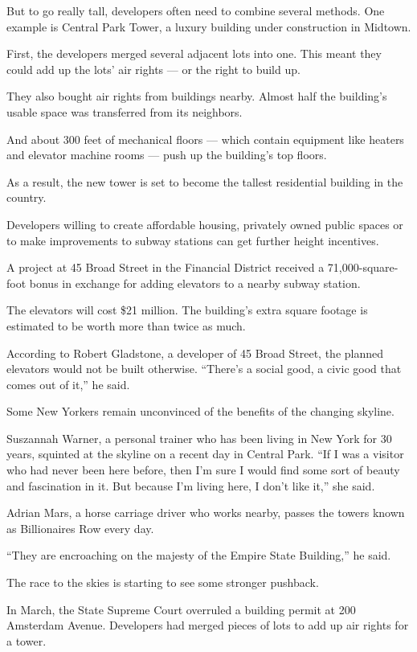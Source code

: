 But to go really tall, developers often need to combine several methods.
One example is Central Park Tower, a luxury building under construction
in Midtown.

First, the developers merged several adjacent lots into one. This meant
they could add up the lots' air rights --- or the right to build up.

They also bought air rights from buildings nearby. Almost half the
building's usable space was transferred from its neighbors.

And about 300 feet of mechanical floors --- which contain equipment like
heaters and elevator machine rooms --- push up the building's top
floors.

As a result, the new tower is set to become the tallest residential
building in the country.

Developers willing to create affordable housing, privately owned public
spaces or to make improvements to subway stations can get further height
incentives.

A project at 45 Broad Street in the Financial District received a
71,000-square-foot bonus in exchange for adding elevators to a nearby
subway station.

The elevators will cost \$21 million. The building's extra square
footage is estimated to be worth more than twice as much.

According to Robert Gladstone, a developer of 45 Broad Street, the
planned elevators would not be built otherwise. ``There's a social good,
a civic good that comes out of it,'' he said.

Some New Yorkers remain unconvinced of the benefits of the changing
skyline.

Suszannah Warner, a personal trainer who has been living in New York for
30 years, squinted at the skyline on a recent day in Central Park. ``If
I was a visitor who had never been here before, then I'm sure I would
find some sort of beauty and fascination in it. But because I'm living
here, I don't like it,'' she said.

Adrian Mars, a horse carriage driver who works nearby, passes the towers
known as Billionaires Row every day.

``They are encroaching on the majesty of the Empire State Building,'' he
said.

The race to the skies is starting to see some stronger pushback.

In March, the State Supreme Court overruled a building permit at 200
Amsterdam Avenue. Developers had merged pieces of lots to add up air
rights for a tower.

